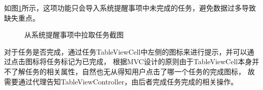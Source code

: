 如图\ref{fig:inbox_no_split}所示，这项功能只会导入系统提醒事项中未完成的任务，避免数据过多导致缺失重点。

\begin{figure}[!hbp]
	\centering
	\caption{从系统提醒事项中拉取任务截图}
	\label{fig:inbox_no_split}
\end{figure}

对于任务是否完成，通过任务TableViewCell中左侧的图标来进行提示，并可以通过点击图标将任务标记为已完成，
根据MVC设计的原则由于TableViewCell本身并不了解任务的相关属性，自然也无从得知用户点击了哪一个任务的完成图标\parencite{ios2017program}，
故需要通过代理告知TableViewController，由后者完成任务完成的相关操作。

